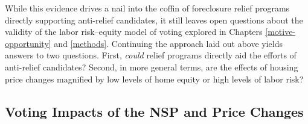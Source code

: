 \documentclass[12pt,oneside]{psthesis}
\begin{document}
While this evidence drives a nail into the coffin of foreclosure relief programs directly supporting anti-relief candidates, it still leaves open questions about the validity of the labor risk--equity model of voting explored in Chapters \ref{motive-opportunity} and \ref{methods}.
Continuing the approach laid out above yields answers to two questions.
First, \emph{could} relief programs directly aid the efforts of anti-relief candidates?
Second, in more general terms, are the effects of housing price changes magnified by low levels of home equity or high levels of labor risk?

\hypertarget{impacts}{%
\subsection{Voting Impacts of the NSP and Price Changes}\label{impacts}}
\end{document}
